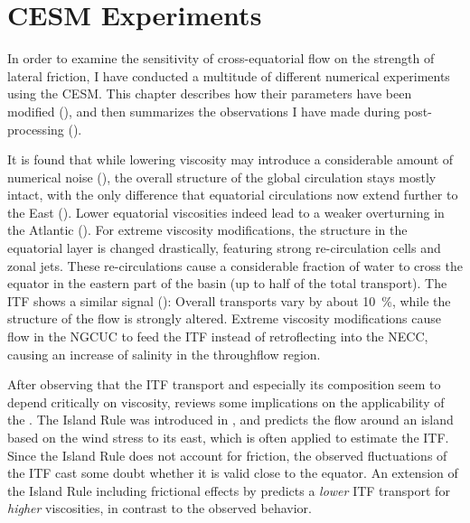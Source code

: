 \chapter{CESM Experiments}
\label{chap:cesm-runs}
In order to examine the sensitivity of cross-equatorial flow on the strength of lateral friction, I have conducted a multitude of different numerical experiments using the \ac{CESM}. This chapter describes how their parameters have been modified (), and then summarizes the observations I have made during post-processing ().

It is found that while lowering viscosity may introduce a considerable amount of numerical noise (), the overall structure of the global circulation stays mostly intact, with the only difference that equatorial circulations now extend further to the East (). Lower equatorial viscosities indeed lead to a weaker overturning in the Atlantic (). For extreme viscosity modifications, the structure in the equatorial layer is changed drastically, featuring strong re-circulation cells and zonal jets. These re-circulations cause a considerable fraction of water to cross the equator in the eastern part of the basin (up to half of the total transport). The \ac{ITF} shows a similar signal (): Overall transports vary by about \SI{10}{\percent}, while the structure of the flow is strongly altered. Extreme viscosity modifications cause flow in the \ac{NGCUC} to feed the \ac{ITF} instead of retroflecting into the \ac{NECC}, causing an increase of salinity in the throughflow region.

After observing that the \ac{ITF} transport and especially its composition seem to depend critically on viscosity,  reviews some implications on the applicability of the . The Island Rule was introduced in \cite{godfrey}, and predicts the flow around an island based on the wind stress to its east, which is often applied to estimate the \ac{ITF}. Since the Island Rule does not account for friction, the observed fluctuations of the \ac{ITF} cast some doubt whether it is valid close to the equator. An extension of the Island Rule including frictional effects by \citet{wajsowicz} predicts a \emph{lower} \ac{ITF} transport for \emph{higher} viscosities, in contrast to the observed behavior.

